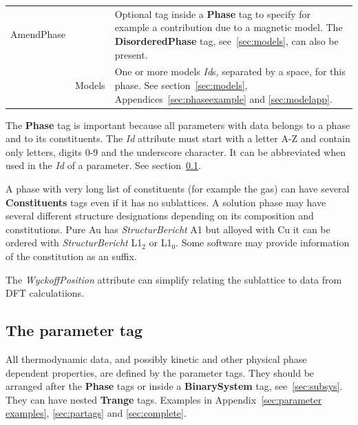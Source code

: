 \documentclass{article}
\begin{document}
\begin{tabular}{|p{} p{} p{}|}
  AmendPhase & & Optional tag inside a {\bf Phase} tag to specify 
                 for example a contribution due to a magnetic model.
                 The {\bf DisorderedPhase} tag, see~\ref{sec:models}, can
                 also be present.\\
        & Models & One or more models {\em Id}s, separated by a space, for this
                  phase.  See section~\ref{sec:models},
                  Appendices~\ref{sec:phaseexample} and
                  \ref{sec:modelapp}.\\\hline

\end{tabular}

\bigskip

The {\bf Phase} tag is important because all parameters with data
belongs to a phase and to its constituents.  The {\em Id} attribute
must start with a letter A-Z and contain only letters, digits 0-9 and
the underscore character.  It can be abbreviated when used in the {\em
  Id} of a parameter.  See section~\ref{sec:parametertag}.

A phase with very long list of constituents (for example the gas) can
have several {\bf Constituents} tags even if it has no sublattices.  A
solution phase may have several different structure designations
depending on its composition and constitutions.  Pure Au has {\em
  StructurBericht} A1 but alloyed with Cu it can be ordered with {\em
  StructurBericht} L1$_2$ or L1$_0$.  Some software may provide
information of the constitution as an suffix.

The {\em WyckoffPosition} attribute can simplify relating the
sublattice to data from DFT calculatiions.

\newpage

\subsection{The parameter tag}\label{sec:parametertag}

All thermodynamic data, and possibly kinetic and other physical phase
dependent properties, are defined by the parameter tags.  They should
be arranged after the {\bf Phase} tags or inside a {\bf BinarySystem}
tag, see~\ref{sec:subsys}.  They can have nested {\bf Trange} tags.
Examples in Appendix~\ref{sec:parameter
  examples}, \ref{sec:partags} and \ref{sec:complete}.
\end{document}
